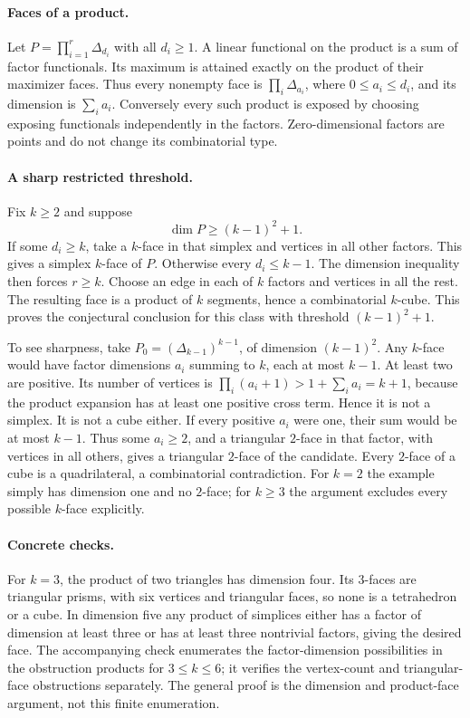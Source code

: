\documentclass[11pt,a4paper]{article}
\begin{document}
\paragraph{Faces of a product.}
Let $P=\prod_{i=1}^r\Delta_{d_i}$ with all $d_i\ge1$. A linear functional on
the product is a sum of factor functionals. Its maximum is attained exactly
on the product of their maximizer faces. Thus every nonempty face is
$\prod_i\Delta_{a_i}$, where $0\le a_i\le d_i$, and its dimension is
$\sum_i a_i$. Conversely every such product is exposed by choosing exposing
functionals independently in the factors. Zero-dimensional factors are points
and do not change its combinatorial type.

\paragraph{A sharp restricted threshold.}
Fix $k\ge2$ and suppose
\[
                    \dim P\ge(k-1)^2+1.
\]
If some $d_i\ge k$, take a $k$-face in that simplex and vertices in all other
factors. This gives a simplex $k$-face of $P$. Otherwise every $d_i\le k-1$.
The dimension inequality then forces $r\ge k$. Choose an edge in each of
$k$ factors and vertices in all the rest. The resulting face is a product
of $k$ segments, hence a combinatorial $k$-cube. This proves the conjectural
conclusion for this class with threshold $(k-1)^2+1$.

To see sharpness, take $P_0=(\Delta_{k-1})^{k-1}$, of dimension $(k-1)^2$.
Any $k$-face would have factor dimensions $a_i$ summing to $k$, each at most
$k-1$. At least two are positive. Its number of vertices is
$\prod_i(a_i+1)>1+\sum_i a_i=k+1$, because the product expansion has at least
one positive cross term. Hence it is not a simplex.
It is not a cube either. If every positive $a_i$ were one, their sum would
be at most $k-1$. Thus some $a_i\ge2$, and a triangular $2$-face in that
factor, with vertices in all others, gives a triangular $2$-face of the
candidate. Every $2$-face of a cube is a quadrilateral, a combinatorial
contradiction. For $k=2$ the example simply has dimension one and no $2$-face;
for $k\ge3$ the argument excludes every possible $k$-face explicitly.

\paragraph{Concrete checks.}
For $k=3$, the product of two triangles has dimension four. Its $3$-faces
are triangular prisms, with six vertices and triangular faces, so none is
a tetrahedron or a cube. In dimension five any product of simplices either
has a factor of dimension at least three or has at least three nontrivial
factors, giving the desired face. The accompanying check enumerates the
factor-dimension possibilities in the obstruction products for $3\le k\le6$;
it verifies the vertex-count and triangular-face obstructions separately.
The general proof is the dimension and product-face argument, not this finite
enumeration.
\end{document}
